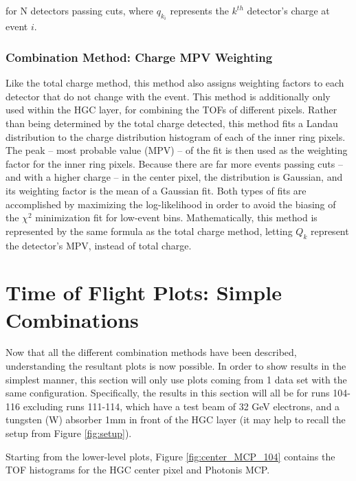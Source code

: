 \documentclass[12pt]{article}
\begin{document}
for N detectors passing cuts, where $q_{k_i}$ represents the $k^{th}$ detector's charge at event $i$.

\subsubsection{Combination Method: Charge MPV Weighting}
Like the total charge method, this method also assigns weighting factors to each detector that do not change with the event. 
This method is additionally only used within the HGC layer, for combining the TOFs of different pixels. 
Rather than being determined by the total charge detected, this method fits a Landau distribution to the charge distribution histogram of each of the inner ring pixels.
The peak -- most probable value (MPV) -- of the fit is then used as the weighting factor for the inner ring pixels. 
Because there are far more events passing cuts -- and with a higher charge -- in the center pixel, the distribution is Gaussian, and its weighting factor is the mean of a Gaussian fit.
Both types of fits are accomplished by maximizing the log-likelihood in order to avoid the biasing of the $\chi^2$ minimization fit for low-event bins.
Mathematically, this method is represented by the same formula as the total charge method, letting $Q_k$ represent the detector's MPV, instead of total charge.


\section{Time of Flight Plots: Simple Combinations}
Now that all the different combination methods have been described, understanding the resultant plots is now possible. 
In order to show results in the simplest manner, this section will only use plots coming from 1 data set with the same configuration. 
Specifically, the results in this section will all be for runs 104-116 excluding runs 111-114, which have a test beam of 32 GeV electrons, and a tungsten (W) absorber 1mm in front of the HGC layer (it may help to recall the setup from Figure \ref{fig:setup}).

Starting from the lower-level plots, Figure \ref{fig:center_MCP_104} contains the TOF histograms for the HGC center pixel and Photonis MCP.
\end{document}
